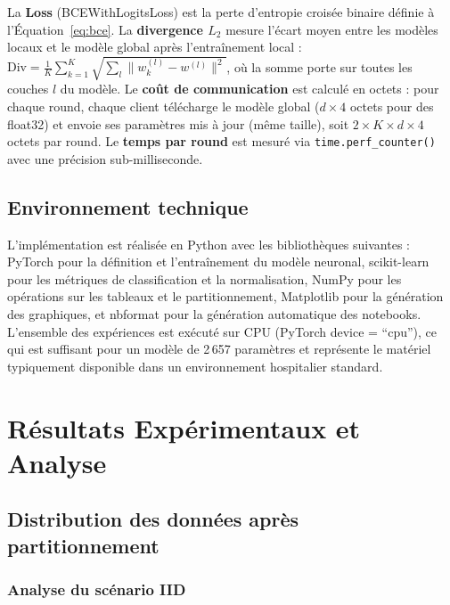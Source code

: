 \documentclass[12pt,a4paper]{report}
\begin{document}
La \textbf{Loss} (BCEWithLogitsLoss) est la perte d'entropie crois\'{e}e binaire d\'{e}finie \`{a} l'\'{E}quation~\ref{eq:bce}. La \textbf{divergence $L_2$} mesure l'\'{e}cart moyen entre les mod\`{e}les locaux et le mod\`{e}le global apr\`{e}s l'entra\^{i}nement local : $\text{Div} = \frac{1}{K}\sum_{k=1}^{K}\sqrt{\sum_{l}\|w_k^{(l)} - w^{(l)}\|^2}$, o\`{u} la somme porte sur toutes les couches $l$ du mod\`{e}le. Le \textbf{co\^{u}t de communication} est calcul\'{e} en octets : pour chaque round, chaque client t\'{e}l\'{e}charge le mod\`{e}le global ($d \times 4$ octets pour des float32) et envoie ses param\`{e}tres mis \`{a} jour (m\^{e}me taille), soit $2 \times K \times d \times 4$ octets par round. Le \textbf{temps par round} est mesur\'{e} via \texttt{time.perf\_counter()} avec une pr\'{e}cision sub-milliseconde.

\section{Environnement technique}

L'impl\'{e}mentation est r\'{e}alis\'{e}e en Python avec les biblioth\`{e}ques suivantes : PyTorch pour la d\'{e}finition et l'entra\^{i}nement du mod\`{e}le neuronal, scikit-learn pour les m\'{e}triques de classification et la normalisation, NumPy pour les op\'{e}rations sur les tableaux et le partitionnement, Matplotlib pour la g\'{e}n\'{e}ration des graphiques, et nbformat pour la g\'{e}n\'{e}ration automatique des notebooks. L'ensemble des exp\'{e}riences est ex\'{e}cut\'{e} sur CPU (PyTorch device = ``cpu''), ce qui est suffisant pour un mod\`{e}le de 2\,657 param\`{e}tres et repr\'{e}sente le mat\'{e}riel typiquement disponible dans un environnement hospitalier standard.

\chapter{R\'{e}sultats Exp\'{e}rimentaux et Analyse}

\section{Distribution des donn\'{e}es apr\`{e}s partitionnement}

\subsection{Analyse du sc\'{e}nario IID}
\end{document}
